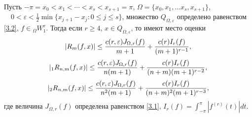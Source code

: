 \begin{theorem}
 Пусть $-\pi=x_0<x_1<\cdots<x_s<x_{s+1}=\pi$, $\Omega=\{x_0,x_1,\ldots x_s,x_{s+1}\}$,  $\quad 0<\varepsilon<\frac12\min\{x_{j+1}-x_{j}:0\le j\le s\}$, множество $Q_{\Omega,\varepsilon}$ определено равенством \eqref{3.2},
$f\in {}_\Omega W_1^r$. Тогда если $r\ge4$, $x\in Q_{\Omega,\varepsilon}$, то
имеют место оценки
$$
|R_{m}(f,x)|\le{c(r,\varepsilon)J_{\Omega,r}(f)\over m+1}+{c(r)I_r(f)\over (m+1)^{r-1}},
$$
$$
|_1R_{n,m}(f,x)|\le{c(r,\varepsilon)J_{\Omega,r}(f)\over n(m+1)}+{c(r)I_r(f)\over (n+m)(m+1)^{r-2}},
$$
$$
|_2R_{n,m}(f,x)|\le{c(r,\varepsilon)J_{\Omega,r}(f)\over n^2(m+1)}+{c(r)I_r(f)\over (n+m)^2(m+1)^{r-3}},
$$
где величина $J_{\Omega,r}(f)$ определена равенством \eqref{3.1},
 $I_r(f)=\int_{-\pi}^{\pi}|f^{(r)}(t)|dt$.
\end{theorem}

